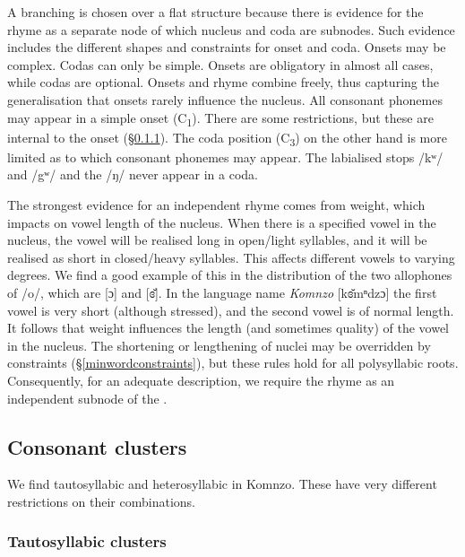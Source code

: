 A branching  is chosen over a flat structure because there is evidence for the rhyme as a separate node of which nucleus and coda are subnodes. Such evidence includes the different shapes and constraints for onset and coda. Onsets may be complex. Codas can only be simple. Onsets are obligatory in almost all cases, while codas are optional. Onsets and rhyme combine freely, thus capturing the generalisation that onsets rarely influence the nucleus. All consonant phonemes may appear in a simple onset (C\textsubscript{1}). There are some restrictions, but these are internal to the onset ({\S}\ref{tautosyllabiccc}). The coda position (C\textsubscript{3}) on the other hand is more limited as to which consonant phonemes may appear. The labialised  stops /kʷ/ and /{\ᵑ}gʷ/ and the   /ŋ/ never appear in a coda.

The strongest evidence for an independent rhyme comes from  weight, which impacts on vowel length of the nucleus. When there is a specified vowel in the nucleus, the vowel will be realised long in open/light syllables, and it will be realised as short in closed/heavy syllables. This affects different vowels to varying degrees. We find a good example of this in the distribution of the two allophones of /o/, which are [ɔ] and [ɞ̆]. In the language name \emph{Komnzo} [kɞ̆mⁿdzɔ] the first vowel is very short (although stressed), and the second vowel is of normal length. It follows that  weight influences the length (and sometimes quality) of the vowel in the nucleus. The shortening or lengthening of nuclei may be overridden by  constraints ({\S}\ref{minwordconstraints}), but these rules hold for all polysyllabic roots. Consequently, for an adequate description, we require the rhyme as an independent subnode of the .

\subsection{Consonant clusters} \label{consonantclusters}

We find tautosyllabic and heterosyllabic  in Komnzo. These have very different restrictions on their combinations.

\subsubsection{Tautosyllabic clusters} \label{tautosyllabiccc}

